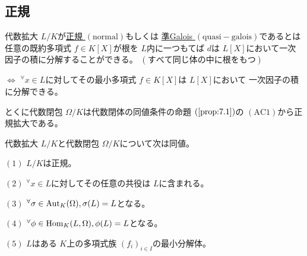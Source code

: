\documentclass[../master_galois_theory]{subfiles}
\begin{document}
\subsection{正規}

\begin{defi} \label{defi:normal}
  代数拡大 $L/K$が\underline{正規 $(\mathrm{normal})$}もしくは
  \underline{準\rm{Galois} $(\mathrm{quasi-galois})$}であるとは
  任意の既約多項式 $f \in K[X]$が根を $L$内に一つもてば
  $d$は $L[X]$において一次因子の積に分解することができる。
  $(すべて同じ体の中に根をもつ)$

  $\Leftrightarrow$
  ${}^\forall x \in L$に対してその最小多項式 $f \in K[X]$は $L[X]$において
  一次因子の積に分解できる。

  とくに代数閉包 $\Omega/K$は代数閉体の同値条件の命題 $(\mathrm{\ref{prop:7.1}})$の $(\mathrm{AC}1)$から正規拡大である。
\end{defi}

\begin{prop} \label{prop:11.1}
  代数拡大 $L/K$と代数閉包 $\Omega/K$について次は同値。

  $(1)$
  $L/K$は正規。

  $(2)$
  ${}^\forall x \in L$に対してその任意の共役は $L$に含まれる。

  $(3)$
  ${}^\forall \sigma \in \mathrm{Aut}_K(\Omega) , \sigma(L) = L$となる。

  $(4)$
  ${}^\forall \phi \in \mathrm{Hom}_K(L,\Omega) , \phi(L) = L$となる。

  $(5)$
  $L$はある $K$上の多項式族 $(f_i)_{i \in I}$の最小分解体。
\end{prop}
\end{document}
